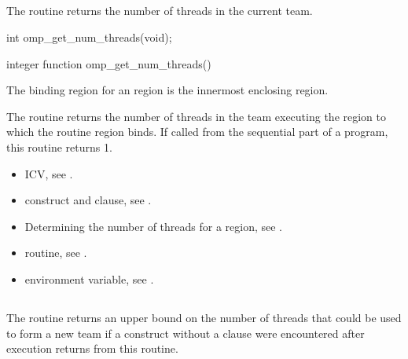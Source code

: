 \subsection{}
\label{subsec:omp_get_num_threads}
\summary
The  routine returns the number of threads in the current
team.
\format
\begin{ccppspecific}
\begin{ompcFunction}
int omp_get_num_threads(void);
\end{ompcFunction}
\end{ccppspecific}

\begin{fortranspecific}
\begin{ompfFunction}
integer function omp_get_num_threads()
\end{ompfFunction}
\end{fortranspecific}

\binding
The binding region for an  region is the innermost enclosing
 region.

\effect
The  routine returns the number of threads in the team
executing the  region to which the routine region binds. If called from the
sequential part of a program, this routine returns 1.

\crossreferences
\begin{itemize}


\item {} ICV, see
.

\item {} construct and  clause, see
.

\item Determining the number of threads for a  region, see
.

\item {} routine, see
.

\item {} environment variable, see
.
\end{itemize}




\subsection{}
\label{subsec:omp_get_max_threads}
\summary
The  routine returns an upper bound on the number of
threads that could be used to form a new team if a  construct without a
 clause were encountered after execution returns from this routine.

